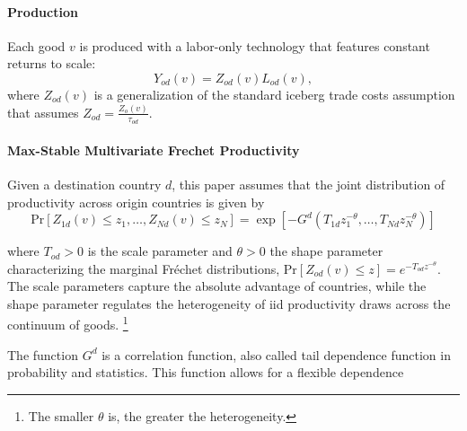 \paragraph{Production}
Each good $v$ is produced with a labor-only technology that features constant returns to scale:
\begin{equation}
    Y_{od}(v) = Z_{od}(v)L_{od}(v),
\end{equation}
where $Z_{od}(v)$ is a generalization of the standard iceberg trade costs assumption 
that assumes $Z_{od} = \frac{Z_o(v)}{\tau_{od}}$.

\paragraph{Max-Stable Multivariate Frechet Productivity}
Given a destination country $d$,
this paper assumes that the joint distribution of productivity across 
origin countries is given by
\begin{equation}
    \text{Pr}\left[Z_{1 d}(v) \leq z_1, \ldots, Z_{N d}(v) \leq z_N\right]
    =
    \exp \left[-G^d\left(T_{1 d} z_1^{-\theta}, \ldots, T_{N d} z_N^{-\theta}\right)\right]    
\end{equation}

where $T_{o d}>0$ is the scale parameter and 
$\theta>0$ the shape parameter characterizing the marginal Fr\'{e}chet distributions, 
$\text{Pr}\left[Z_{o d}(v) \leq z\right]=e^{-T_{o d} z^{-\theta}}$. 
The scale parameters capture the absolute advantage of countries, 
while the shape parameter regulates the heterogeneity of iid productivity draws across the continuum of goods.%
\footnote{
    The smaller $\theta$ is, the greater the heterogeneity.
}

The function $G^d$ is a correlation function, also called tail dependence function in probability and statistics. This function allows for a flexible dependence